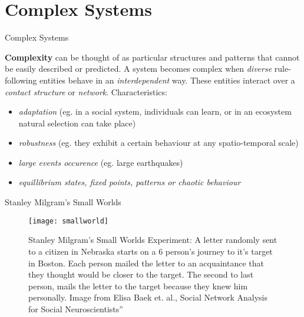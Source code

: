 \section{Complex Systems}

\begin{frame}{Complex Systems}


{\bf Complexity} can be thought of as particular structures and patterns that cannot be easily described or predicted. A system becomes complex when {\it diverse} rule-following entities behave in an {\it interdependent} way. These entities interact over a {\it contact structure} or {\it network}. Characteristics:
\begin{itemize}
	\item {\it adaptation} (eg. in a social system, individuals can learn, or in an ecosystem natural selection can take place)
	\item {\it robustness} (eg. they exhibit a certain behaviour at any spatio-temporal scale)
	\item {\it large events occurence} (eg. large earthquakes)
	\item {\it equillibrium states, fixed points, patterns or chaotic behaviour}
\end{itemize}

\end{frame}


\begin{frame}{Stanley Milgram's Small Worlds}
\begin{figure}[!h]
  \centering
  \texttt{[image: smallworld]}
  \caption{Stanley Milgram's Small Worlds Experiment: A letter randomly sent to a citizen in Nebraska starts on a 6 person's journey to it's target in Boston. Each person mailed the letter to an acquaintance that they thought would be closer to the target. The second to last person, mails the letter to the target because they knew him personally. Image from Elisa Baek et. al., Social Network Analysis for Social Neuroscientists”}
  \label{fig:smallWorld}
\end{figure}
\end{frame}


